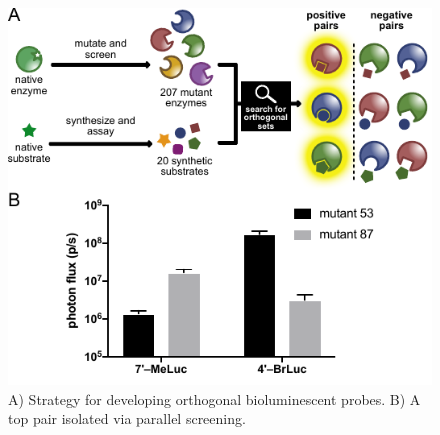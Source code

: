 \documentclass[11pt]{article}
\begin{document}
\begin{figure}
\begin{centering}
\includegraphics[width=\textwidth]{figures/algorithm_v5.pdf}
\end{centering}
\footnotesize
\caption{\label{figure:algorithm}
A) Strategy for developing orthogonal bioluminescent probes. B) A top pair isolated via parallel screening.
}
\end{figure}
\end{document}
